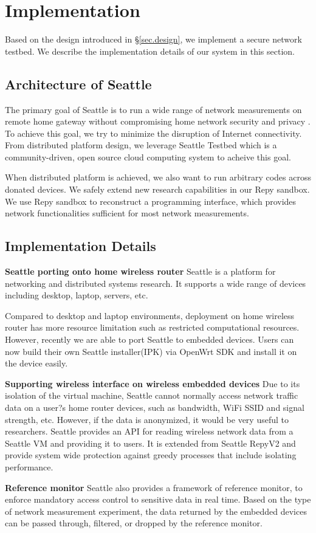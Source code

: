 \section{Implementation} 
\label{sec.implementation}

Based on the design introduced in \S{\ref{sec.design}}, we implement a 
secure network testbed. We describe the implementation details of our system 
in this section.

\subsection{Architecture of Seattle}
The primary goal of Seattle is to run a wide range of network measurements 
on remote home gateway without compromising home network security and privacy
. To achieve this goal, we try to minimize the disruption of Internet 
connectivity. From distributed platform design, we leverage Seattle Testbed 
which is a community-driven, open source cloud computing system to acheive 
this goal. 

When distributed platform is achieved, we also want to run arbitrary codes 
across donated devices. We safely extend new research capabilities in our 
Repy sandbox. We use Repy sandbox to reconstruct a programming interface, 
which provides network functionalities sufficient for most network 
measurements.

\subsection{Implementation Details}
\textbf{Seattle porting onto home wireless router} 
Seattle is a platform for networking and distributed systems research. It 
supports a wide range of devices including desktop, laptop, servers, etc.

Compared to desktop and laptop environments, deployment on home wireless 
router has more resource limitation such as restricted computational 
resources. However, recently we are able to port Seattle to embedded devices.
Users can now build their own Seattle installer(IPK) via OpenWrt SDK and 
install it on the device easily. 

\textbf{Supporting wireless interface on wireless embedded devices} 
Due to its isolation of the virtual machine, Seattle cannot normally access 
network traffic data on a user?s home router devices, such as bandwidth, 
WiFi SSID and signal strength, etc. However, if the data is anonymized, it 
would be very useful to researchers. Seattle provides an API for reading 
wireless network data from a Seattle VM and providing it to users. It is 
extended from Seattle RepyV2 and provide system wide protection against 
greedy processes that include isolating performance. 

\textbf{Reference monitor}
Seattle also provides a framework of reference monitor, to enforce mandatory 
access control to sensitive data in real time. Based on the type of network 
measurement experiment, the data returned by the embedded devices can be 
passed through, filtered, or dropped by the reference monitor.
